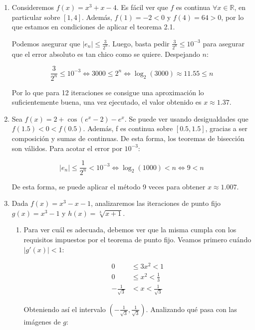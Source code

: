 \documentclass[DIN, pagenumber=false, fontsize=11pt, parskip=half]{scrartcl}
\begin{document}
\begin{enumerate}
    De esta forma, estamos en condiciones de aplicar el método de bisección para hallar una raíz de $f$.
    Aplicando 20 iteraciones de éste método, se consigue el valor $x \approx 1.25992107$.

    \item Consideremos $f(x) = x^3 + x - 4$. Es fácil ver que $f$ es continua $\forall x \in \mathbb{R}$,
    en particular sobre $[1,4]$. Además, $f(1) = -2 < 0$ y $f(4) = 64 > 0$, por lo que estamos en condiciones de aplicar el teorema 2.1.
    
    Podemos asegurar que $|e_n| \le \frac{3}{2^n}$. Luego, basta pedir $\frac{3}{2^n} \le 10^{-3}$ para asegurar que
    el error absoluto es tan chico como se quiere. Despejando $n$:

    \[ \frac{3}{2^n} \le 10^{-3} \iff 3000 \le 2^n \iff \log_2(3000) \approx 11.55 \le n \]

    Por lo que para 12 iteraciones se consigue una aproximación lo suficientemente buena, una vez ejecutado, el valor obtenido es $x \approx 1.37$.

    \item Sea $f(x) = 2 + \cos (e^x - 2) - e^x$. Se puede ver usando desigualdades que $f(1.5)<0<f(0.5)$.
    Además, f es continua sobre $[0.5,1.5]$, gracias a ser composición y sumas de continuas. De esta forma,
    los teoremas de bisección son válidos. Para acotar el error por $10^{-3}$:

    \[ |e_n| \le \frac{1}{2^n} < 10^{-3} \iff \log_2 (1000) < n \iff 9 < n \]

    De esta forma, se puede aplicar el método 9 veces para obtener $x \approx 1.007$.

    \item Dada $f(x) = x^3 - x - 1$, analizaremos las iteraciones de punto fijo $g(x) = x^3 - 1$ y $h(x) = \sqrt[3]{x + 1}$.
    \begin{enumerate}
        \item Para ver cuál es adecuada, debemos ver que la misma cumpla con los requisitos impuestos por el teorema de punto fijo.
        Veamos primero cuándo $|g'(x)| < 1$:

        \begin{align*}
            0 &\le 3x^2 < 1 \\
            0 &\le x^2 < \frac{1}{3} \\
            -\frac{1}{\sqrt{3}} &< x < \frac{1}{\sqrt{3}}
        \end{align*}

        Obteniendo así el intervalo $(-\frac{1}{\sqrt{3}}, \frac{1}{\sqrt{3}})$. Analizando qué pasa con las imágenes de $g$:


\end{enumerate}
\end{enumerate}
\end{document}
